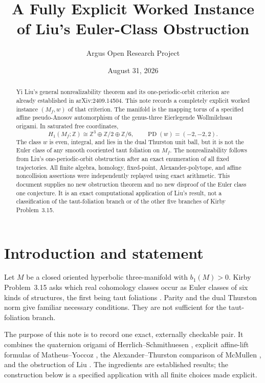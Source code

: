 \documentclass[10pt,reqno]{amsart}
\title[A worked instance of Liu's Euler-class obstruction]
{A Fully Explicit Worked Instance of Liu's Euler-Class Obstruction}
\author{Argus Open Research Project}
\date{August 31, 2026}
\theoremstyle{definition}
\newcommand{\Z}{\mathbb Z}
\newcommand{\PD}{\operatorname{PD}}
\begin{document}
\begin{abstract}
Yi Liu's general nonrealizability theorem and its one-periodic-orbit
criterion are already established in arXiv:2409.14504.  This note records a
completely explicit worked instance \((M_f,w)\) of that criterion.  The
manifold is the mapping torus of a specified
affine pseudo-Anosov automorphism of the genus-three Eierlegende
Wollmilchsau origami.  In saturated free coordinates,
\[
 H_1(M_f;\Z)\cong \Z^3\oplus\Z/2\oplus\Z/6,
 \qquad \PD(w)=(-2,-2,2).
\]
The class \(w\) is even, integral, and lies in the dual Thurston unit ball,
but it is not the Euler class of any smooth cooriented taut foliation on
\(M_f\).  The nonrealizability follows from Liu's one-periodic-orbit
obstruction after an exact enumeration of all fixed trajectories.  All
finite algebra, homology, fixed-point, Alexander-polytope, and affine
noncollision assertions were independently replayed using exact arithmetic.
This document supplies no new obstruction theorem and no new disproof of the
Euler class one conjecture.  It is an exact computational application of
Liu's result, not a classification of the taut-foliation branch or of the
other five branches of Kirby Problem~3.15.
\end{abstract}

\maketitle

\section{Introduction and statement}

Let \(M\) be a closed oriented hyperbolic three-manifold with
\(b_1(M)>0\).  Kirby Problem~3.15 asks which real cohomology classes occur as
Euler classes of six kinds of structures, the first being taut foliations
\cite{BKR}.  Parity and the dual Thurston norm give familiar necessary
conditions.  They are not sufficient for the taut-foliation branch.

The purpose of this note is to record one exact, externally checkable pair.
It combines the quaternion origami of Herrlich--Schmithuesen
\cite{HerrlichSchmithuesen}, explicit affine-lift formulas of
Matheus--Yoccoz \cite{MatheusYoccoz}, the Alexander--Thurston comparison of
McMullen \cite{McMullen}, and the obstruction of Liu \cite{Liu}.  The
ingredients are established results; the construction below is a specified
application with all finite choices made explicit.
\end{document}
